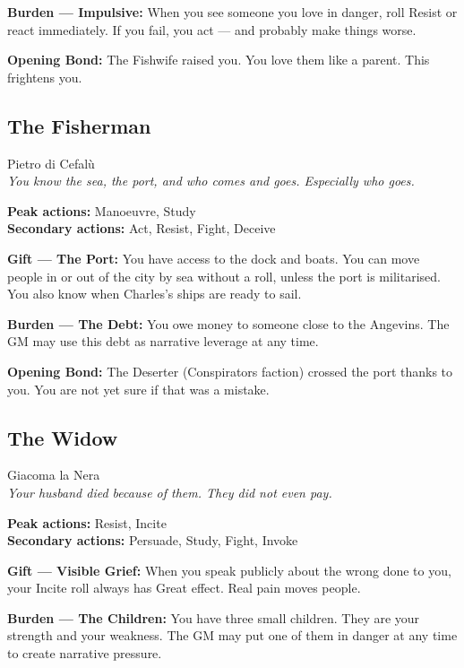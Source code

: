 \textbf{Burden --- Impulsive:} When you see someone you love in
danger, roll Resist or react immediately. If you fail, you act —
and probably make things worse.

\textbf{Opening Bond:} The Fishwife raised you.
You love them like a parent. This frightens you.

\filetto

\subsection{The Fisherman}
{\cinzel\footnotesize\color{grigionote} Pietro di Cefalù}\\
\textit{You know the sea, the port, and who comes and goes. Especially who goes.}

\textbf{Peak actions:} Manoeuvre, Study\\
\textbf{Secondary actions:} Act, Resist, Fight, Deceive

\textbf{Gift --- The Port:} You have access to the dock and boats.
You can move people in or out of the city by sea without a roll,
unless the port is militarised. You also know when Charles's ships
are ready to sail.

\textbf{Burden --- The Debt:} You owe money to someone close to the
Angevins. The GM may use this debt as narrative leverage at any time.

\textbf{Opening Bond:} The Deserter (Conspirators faction) crossed
the port thanks to you. You are not yet sure if that was a mistake.

\filetto

\subsection{The Widow}
{\cinzel\footnotesize\color{grigionote} Giacoma la Nera}\\
\textit{Your husband died because of them. They did not even pay.}

\textbf{Peak actions:} Resist, Incite\\
\textbf{Secondary actions:} Persuade, Study, Fight, Invoke

\textbf{Gift --- Visible Grief:} When you speak publicly about the
wrong done to you, your Incite roll always has Great effect. Real
pain moves people.

\textbf{Burden --- The Children:} You have three small children.
They are your strength and your weakness. The GM may put one of them
in danger at any time to create narrative pressure.

